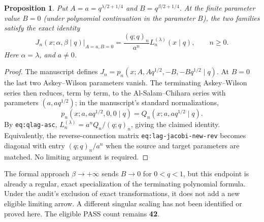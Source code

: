 \documentclass[11pt]{article}
\newtheorem{proposition}{Proposition}
\begin{document}
\begin{proposition}
Put $A=a=q^{\lambda/2+1/4}$ and
$B=q^{\beta/2+1/4}$.  At the finite parameter value $B=0$
(under polynomial continuation in the parameter $B$), the two
families satisfy the exact identity
\[
 J_n(x;\alpha,\beta\mid q)\big|_{A=a,B=0}
 =\frac{(q;q)_n}{a^n}L_n^{(\lambda)}(x\mid q),
 \qquad n\ge0.
\]
Here $\alpha=\lambda$, and $a\ne0$.
\end{proposition}
\begin{proof}
The manuscript defines
$J_n=p_n(x;A,Aq^{1/2},-B,-Bq^{1/2}\mid q)$.
At $B=0$ the last two Askey--Wilson parameters vanish.
The terminating Askey--Wilson series then reduces, term by term,
to the Al-Salam--Chihara series with parameters $(a,aq^{1/2})$;
in the manuscript's standard normalizations,
\[
 p_n(x;a,aq^{1/2},0,0\mid q)
 =Q_n(x;a,aq^{1/2}\mid q).
\]
By \texttt{eq:qlag-asc},
$L_n^{(\lambda)}=a^n Q_n/(q;q)_n$, giving the claimed identity.
Equivalently, the reverse-connection matrix
\texttt{eq:lag-jacobi-new-rev} becomes diagonal with entry
$(q;q)_n/a^n$ when the source and target parameters are matched.
No limiting argument is required.
\end{proof}
\noindent The formal approach $\beta\to+\infty$ sends $B\to0$
for $0<q<1$, but this endpoint is already a regular, exact
specialization of the terminating polynomial formula. Under the
audit's exclusion of exact transformations, it does not add a new
eligible limiting arrow. A different singular scaling has not been
identified or proved here. The eligible PASS count remains \textbf{42}.
\end{document}
